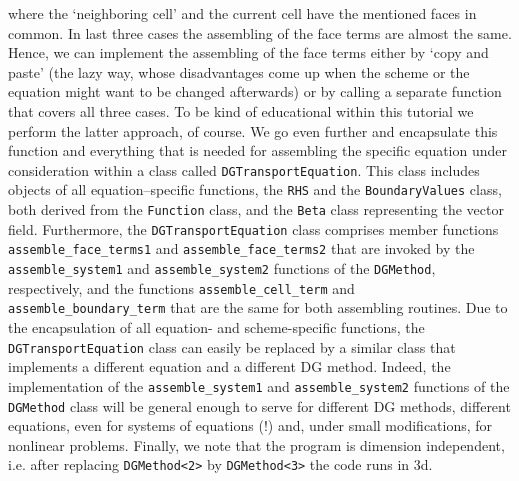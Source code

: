 \documentclass[11pt]{article}
\begin{document}
where the `neighboring cell' and the current cell have the mentioned
faces in common. In last three cases the assembling of the face terms
are almost the same. Hence, we can implement the assembling of the
face terms either by `copy and paste' (the lazy way, whose
disadvantages come up when the scheme or the equation might want to be
changed afterwards) or by calling a separate function that covers all
three cases. To be kind of educational within this tutorial we perform
the latter approach, of course. We go even further and encapsulate
this function and everything that is needed for assembling the
specific equation under consideration within a class called
{\tt DGTransportEquation}. This class includes objects of all
equation--specific functions, the {\tt RHS} and the
{\tt BoundaryValues} class, both derived from the {\tt Function}
class, and the {\tt Beta} class representing the vector field.
Furthermore, the {\tt DGTransportEquation} class comprises member
functions {\tt assemble\_face\_terms1} and
{\tt assemble\_face\_terms2} that are invoked by the
{\tt assemble\_system1} and {\tt assemble\_system2} functions of the
{\tt DGMethod}, respectively, and the functions
{\tt assemble\_cell\_term} and {\tt assemble\_boundary\_term} that
are the same for both assembling routines. Due to the encapsulation of
all equation- and scheme-specific functions, the
{\tt DGTransportEquation} class can easily be replaced by a similar
class that implements a different equation and a different DG method.
Indeed, the implementation of the {\tt assemble\_system1} and
{\tt assemble\_system2} functions of the {\tt DGMethod} class will
be general enough to serve for different DG methods, different
equations, even for systems of equations (!) and, under small
modifications, for nonlinear problems. Finally, we note that the
program is dimension independent, i.e. after replacing
{\tt DGMethod<2>} by {\tt DGMethod<3>} the code runs in 3d.
\end{document}
